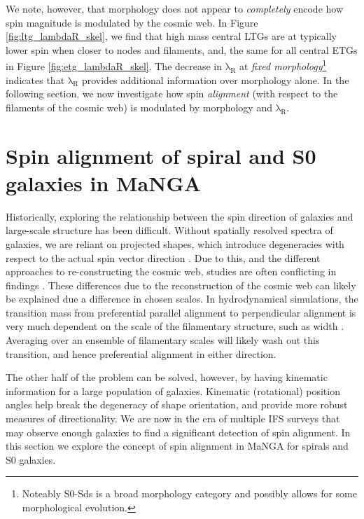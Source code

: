 We note, however, that morphology does not appear to \textit{completely} encode how spin magnitude is modulated by the cosmic web. In Figure \ref{fig:ltg_lambdaR_skel}, we find that high mass central LTGs are at typically lower spin when closer to nodes and filaments, and, the same for all central ETGs in Figure \ref{fig:etg_lambdaR_skel}. The decrease in $\mathrm{\lambda_R}$ at \textit{fixed morphology}\footnote{Noteably S0-Sds is a broad morphology category and possibly allows for some morphological evolution.} indicates that $\mathrm{\lambda_R}$ provides additional information over morphology alone. In the following section, we now investigate how spin \textit{alignment} (with respect to the filaments of the cosmic web) is modulated by morphology and $\mathrm{\lambda_R}$. 

\section{Spin alignment of spiral and S0 galaxies in MaNGA} \label{sec:spin_alignment}
Historically, exploring the relationship between the spin direction of galaxies and large-scale structure has been difficult. Without spatially resolved spectra of galaxies, we are reliant on projected shapes, which introduce degeneracies with respect to the actual spin vector direction \citep[e.g. see Fig 2. in][for example of degeneracies that can occur]{motloch2020}. Due to this, and the different approaches to re-constructing the cosmic web, studies are often conflicting in findings \citep[e.g. spiral galaxies having parallel vs perpendicular orientations with respect to the cosmic web][]{tempel2013a, tempel2013b, lee2007, jones2010, zhang2015}. These differences due to the reconstruction of the cosmic web can likely be explained due a difference in chosen scales. In hydrodynamical simulations, the transition mass from preferential parallel alignment to perpendicular alignment is very much dependent on the scale of the filamentary structure, such as width \citep{ganeshaiahveena2019, Kraljic2019flip}. Averaging over an ensemble of filamentary scales will likely wash out this transition, and hence preferential alignment in either direction. 

The other half of the problem can be solved, however, by having kinematic information for a large population of galaxies. Kinematic (rotational) position angles help break the degeneracy of shape orientation, and provide more robust measures of directionality. We are now in the era of multiple IFS surveys that may observe enough galaxies to find a significant detection of spin alignment. In this section we explore the concept of spin alignment in MaNGA for spirals and S0 galaxies.

